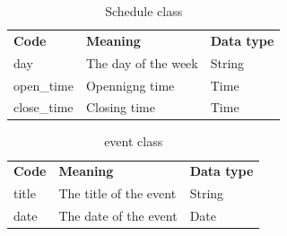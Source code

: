 \documentclass[12pt,a4paper]{report}
\begin{document}
	\begin{table}[H]
		\begin{center}
			\captionsetup[table]{skip=10pt}
			\caption{Schedule class}
			\setlength\doublerulesep{0.5pt}
			
			\begin{tabular}{|  p{5cm}|  p{6cm}|  p{4cm}|}
				\rowcolor{LightCyan}
				
				\hline
				\multicolumn{3}{c}{Schedule class}\\
				\hline 
				\textbf{Code} & \textbf{Meaning} & \textbf{Data type} 
				\\ \hline
				
				day &                        
				The day of the week &                        
				String  
				\\ \hline
				
				open\_time &                        
				Opennigng time &                        
				Time 
				\\ \hline
				
				close\_time &                        
				Closing time &                        
				Time                   
				
				\\ \hline
				
				
			\end{tabular}
			
		\end{center}
	\end{table}
	\begin{table}[H]
		\begin{center}
			\captionsetup[table]{skip=10pt}
			\caption{event class}
			\setlength\doublerulesep{0.5pt}
			
			\begin{tabular}{|  p{5cm}|  p{6cm}|  p{4cm}|}
				\rowcolor{LightCyan}
				
				\hline
				\multicolumn{3}{c}{event class}\\
				\hline 
				\textbf{Code} & \textbf{Meaning} & \textbf{Data type} 
				\\ \hline
				
				title &                        
				The title of the event &                        
				String  
				\\ \hline
				
				date &                        
				The date of the event &                        
				Date            
				
				\\ \hline
				
				
			\end{tabular}
			
		\end{center}
	\end{table}
\end{document}

